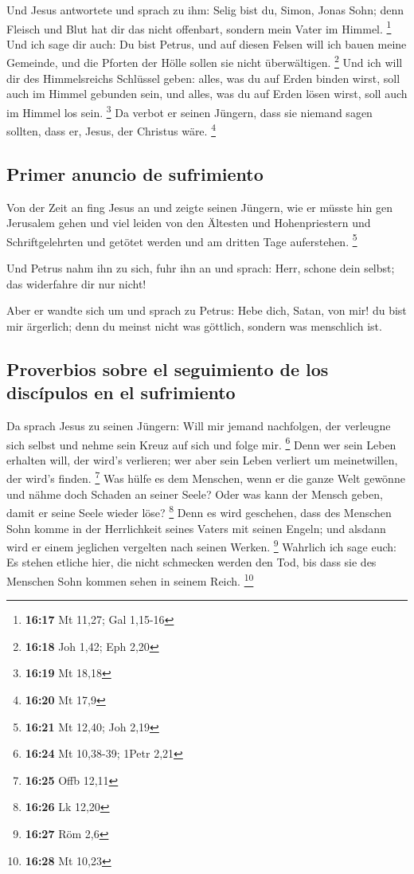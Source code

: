  Und Jesus antwortete und sprach zu ihm: Selig bist du,
Simon, Jonas Sohn; denn Fleisch und Blut hat dir das nicht offenbart,
sondern mein Vater im Himmel. \footnote{\textbf{16:17} Mt 11,27; Gal
  1,15-16}  Und ich sage dir auch: Du bist Petrus, und
auf diesen Felsen will ich bauen meine Gemeinde, und die Pforten der
Hölle sollen sie nicht überwältigen. \footnote{\textbf{16:18} Joh 1,42;
  Eph 2,20}  Und ich will dir des Himmelsreichs Schlüssel
geben: alles, was du auf Erden binden wirst, soll auch im Himmel
gebunden sein, und alles, was du auf Erden lösen wirst, soll auch im
Himmel los sein. \footnote{\textbf{16:19} Mt 18,18}  Da
verbot er seinen Jüngern, dass sie niemand sagen sollten, dass er,
Jesus, der Christus wäre. \footnote{\textbf{16:20} Mt 17,9}

\hypertarget{primer-anuncio-de-sufrimiento}{%
\subsection{Primer anuncio de
sufrimiento}\label{primer-anuncio-de-sufrimiento}}

 Von der Zeit an fing Jesus an und zeigte seinen Jüngern,
wie er müsste hin gen Jerusalem gehen und viel leiden von den Ältesten
und Hohenpriestern und Schriftgelehrten und getötet werden und am
dritten Tage auferstehen. \footnote{\textbf{16:21} Mt 12,40; Joh 2,19}

 Und Petrus nahm ihn zu sich, fuhr ihn an und sprach:
Herr, schone dein selbst; das widerfahre dir nur nicht!

 Aber er wandte sich um und sprach zu Petrus: Hebe dich,
Satan, von mir! du bist mir ärgerlich; denn du meinst nicht was
göttlich, sondern was menschlich ist.

\hypertarget{proverbios-sobre-el-seguimiento-de-los-discuxedpulos-en-el-sufrimiento}{%
\subsection{Proverbios sobre el seguimiento de los discípulos en el
sufrimiento}\label{proverbios-sobre-el-seguimiento-de-los-discuxedpulos-en-el-sufrimiento}}

 Da sprach Jesus zu seinen Jüngern: Will mir jemand
nachfolgen, der verleugne sich selbst und nehme sein Kreuz auf sich und
folge mir. \footnote{\textbf{16:24} Mt 10,38-39; 1Petr 2,21}
 Denn wer sein Leben erhalten will, der wird's verlieren;
wer aber sein Leben verliert um meinetwillen, der wird's finden.
\footnote{\textbf{16:25} Offb 12,11}  Was hülfe es dem
Menschen, wenn er die ganze Welt gewönne und nähme doch Schaden an
seiner Seele? Oder was kann der Mensch geben, damit er seine Seele
wieder löse? \footnote{\textbf{16:26} Lk 12,20}  Denn es
wird geschehen, dass des Menschen Sohn komme in der Herrlichkeit seines
Vaters mit seinen Engeln; und alsdann wird er einem jeglichen vergelten
nach seinen Werken. \footnote{\textbf{16:27} Röm 2,6} 
Wahrlich ich sage euch: Es stehen etliche hier, die nicht schmecken
werden den Tod, bis dass sie des Menschen Sohn kommen sehen in seinem
Reich. \footnote{\textbf{16:28} Mt 10,23}

